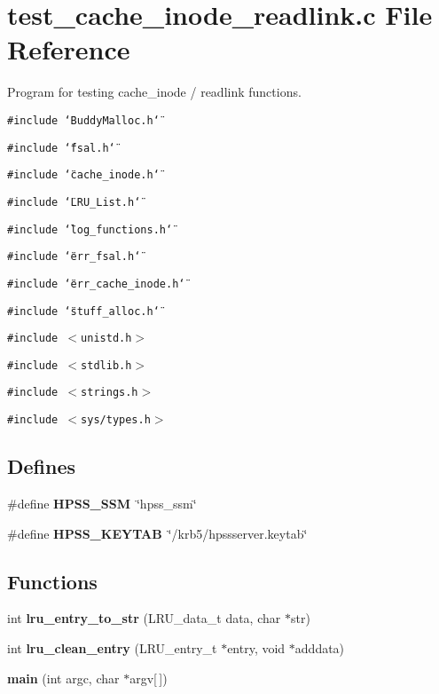 \section{test\_\-cache\_\-inode\_\-readlink.c File Reference}
\label{test__cache__inode__readlink_8c}
Program for testing cache\_\-inode / readlink functions. 

{\tt \#include \char`\"{}Buddy\-Malloc.h\char`\"{}}\par
{\tt \#include \char`\"{}fsal.h\char`\"{}}\par
{\tt \#include \char`\"{}cache\_\-inode.h\char`\"{}}\par
{\tt \#include \char`\"{}LRU\_\-List.h\char`\"{}}\par
{\tt \#include \char`\"{}log\_\-functions.h\char`\"{}}\par
{\tt \#include \char`\"{}err\_\-fsal.h\char`\"{}}\par
{\tt \#include \char`\"{}err\_\-cache\_\-inode.h\char`\"{}}\par
{\tt \#include \char`\"{}stuff\_\-alloc.h\char`\"{}}\par
{\tt \#include $<$unistd.h$>$}\par
{\tt \#include $<$stdlib.h$>$}\par
{\tt \#include $<$strings.h$>$}\par
{\tt \#include $<$sys/types.h$>$}\par
\subsection*{Defines}
\begin{CompactItemize}
\item 
\#define {\bf HPSS\_\-SSM}\ \char`\"{}hpss\_\-ssm\char`\"{}
\item 
\#define {\bf HPSS\_\-KEYTAB}\ \char`\"{}/krb5/hpssserver.keytab\char`\"{}
\end{CompactItemize}
\subsection*{Functions}
\begin{CompactItemize}
\item 
int {\bf lru\_\-entry\_\-to\_\-str} (LRU\_\-data\_\-t data, char $\ast$str)
\item 
int {\bf lru\_\-clean\_\-entry} (LRU\_\-entry\_\-t $\ast$entry, void $\ast$adddata)
\item 
{\bf main} (int argc, char $\ast$argv[$\,$])
\end{CompactItemize}


